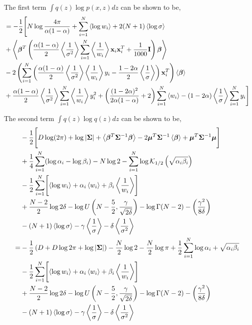 \documentclass{article}
\begin{document}
The first term $\int q(z)\log p(x,z)dz$ can be shown to be,
\begin{align}
\nonumber
&=-\frac{1}{2}\Biggl[N\log\frac{4\pi}{\alpha(1-\alpha)}+\sum_{i=1}^{N}\left\langle\log w_i\right\rangle +2(N+1)\left\langle\log\sigma\right\rangle\\
\nonumber&+\left\langle\bm{\beta}^T\left(\frac{\alpha(1-\alpha)}{2}\left\langle\frac{1}{\sigma^2}\right\rangle\sum_{i=1}^{N}\left\langle\frac{1}{w_i}\right\rangle\mathbf{x}_i\mathbf{x}_i^T+\frac{1}{1000}\mathbf{I}\right)\bm{\beta}\right\rangle\\
\nonumber
&-2\left(\sum_{i=1}^{N}\left(\frac{\alpha(1-\alpha)}{2}\left\langle\frac{1}{\sigma^2}\right\rangle\left\langle\frac{1}{w_i}\right\rangle y_i-\frac{1-2\alpha}{2}\left\langle\frac{1}{\sigma}\right\rangle\right)\mathbf{x}_i^T\right)\left\langle\bm{\beta}\right\rangle\\
\nonumber
&+\frac{\alpha(1-\alpha)}{2}\left\langle\frac{1}{\sigma^2}\right\rangle\sum_{i=1}^{N}\left\langle\frac{1}{w_i}\right\rangle y_i^2+\left(\frac{(1-2\alpha)^2}{2\alpha(1-\alpha)}+2\right)\sum_{i=1}^{N}\left\langle w_i\right\rangle-(1-2\alpha)\left\langle\frac{1}{\sigma}\right\rangle\sum_{i=1}^{N} y_i\Biggr]
\end{align}

The second term $\int q(z)\log q(z)dz$ can be shown to be,
\begin{align}
\nonumber&-\frac{1}{2}\Biggl[D\log(2\pi)+\log |{\mathbf{\Sigma}}|+\left\langle\bm{\beta}^T{\mathbf{\Sigma}}^{-1}\bm{\beta}\right\rangle-2{\boldsymbol{\mu}}^T{\mathbf{\Sigma}}^{-1}\left\langle\bm{\beta}\right\rangle+{\boldsymbol{\mu}}^T{\mathbf{\Sigma}}^{-1}{\boldsymbol{\mu}}\Biggr]\\
&\nonumber+\frac{1}{4}\sum_{i=1}^{N}(\log\alpha_i-\log\beta_i)-N\log 2- \sum_{i=1}^{N}\log\mathcal{K}_{1/2}\left(\sqrt{\alpha_i\beta_i}\right)\\
\nonumber&-\frac{1}{2}\sum_{i=1}^{N}\Biggl[\left\langle\log w_i\right\rangle +\alpha_i\left\langle w_i\right\rangle+\beta_i\left\langle\frac{1}{w_i}\right\rangle\Biggr]\\
\nonumber&+\frac{N-2}{2}\log 2\delta-\log U\left(N-\frac{5}{2},\frac{\gamma}{\sqrt{2\delta}}\right)-\log \Gamma(N-2)-\left(\frac{\gamma^2}{8\delta}\right)\\
\nonumber&-(N+1)\left\langle\log\sigma\right\rangle-\gamma\left\langle\frac{1}{\sigma}\right\rangle-\delta\left\langle\frac{1}{\sigma^2}\right\rangle\\
\nonumber
=&-\frac{1}{2}\left(D+D\log2\pi+\log|{\mathbf{\Sigma}}|\right)-\frac{N}{2}\log 2-\frac{N}{2}\log\pi+\frac{1}{2}\sum_{i=1}^{N}\log\alpha_i+\sqrt{\alpha_i\beta_i}\\
\nonumber&-\frac{1}{2}\sum_{i=1}^{N}\Biggl[\left\langle\log w_i\right\rangle +\alpha_i\left\langle w_i\right\rangle+\beta_i\left\langle\frac{1}{w_i}\right\rangle\Biggr]\\
\nonumber&+\frac{N-2}{2}\log 2\delta-\log U\left(N-\frac{5}{2},\frac{\gamma}{\sqrt{2\delta}}\right)-\log \Gamma(N-2)-\left(\frac{\gamma^2}{8\delta}\right)\\
\nonumber&-(N+1)\left\langle\log\sigma\right\rangle-\gamma\left\langle\frac{1}{\sigma}\right\rangle-\delta\left\langle\frac{1}{\sigma^2}\right\rangle
\end{align}
\end{document}
